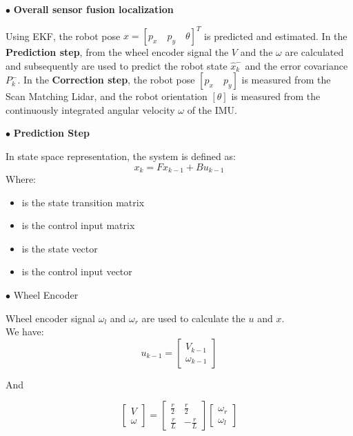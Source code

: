 $\bullet$ \textbf{Overall sensor fusion localization}\par
\hspace{1.27cm}
Using EKF, the robot pose \(x = [p_x\quad p_y\quad \theta]^T\) is predicted and estimated. In the \textbf{Prediction step}, from the wheel encoder signal the \(V\) and the \(\omega\) are calculated and subsequently are used to predict the robot state \(\hat{x}_k^-\) and the error covariance \(P_k^-\). In the \textbf{Correction step}, the robot pose \([p_x\quad p_y]\) is measured from the Scan Matching Lidar, and the robot orientation \([\theta]\) is measured from the continuously integrated angular velocity \(\omega\) of the IMU.\par

$\bullet$ \textbf{Prediction Step}\par
In state space representation, the system is defined as:
\begin{equation} \label{eq:control1}
x_k = F x_{k-1} + B u_{k-1}
\end{equation}
Where:
\begin{itemize}
	\item { is the state transition matrix}
	\item { is the control input matrix}
	\item { is the state vector}
	\item { is the control input vector}

\end{itemize}

\break
$\bullet$ Wheel Encoder\par
Wheel encoder signal \(\omega_l\) and \(\omega_r\) are used to calculate the \(u\) and \(x\).\\ We have:
\begin{equation}
u_{k-1} = 
\begin{bmatrix}
V_{k-1}\\
\omega_{k-1}
\end{bmatrix}
\end{equation}

And

\begin{equation}
\begin{bmatrix}
V\\
\omega
\end{bmatrix}=\begin{bmatrix}
\frac{r}{2} & \frac{r}{2}\\
\frac{r}{L} & -\frac{r}{L}
\end{bmatrix}\begin{bmatrix}
\omega_r\\
\omega_l
\end{bmatrix}
\end{equation}



